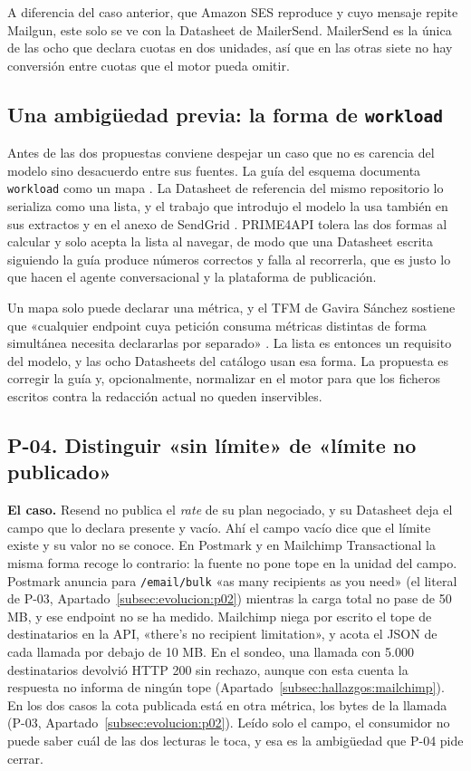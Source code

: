 A diferencia del caso anterior, que Amazon SES reproduce y cuyo mensaje repite Mailgun, este solo se ve con la Datasheet de MailerSend.
MailerSend es la única de las ocho que declara cuotas en dos unidades, así que en las otras siete no hay conversión entre cuotas que el motor pueda omitir.

\subsection{Una ambigüedad previa: la forma de \texttt{workload}}
\label{subsec:evolucion:dv01}

Antes de las dos propuestas conviene despejar un caso que no es carencia del
modelo sino desacuerdo entre sus fuentes. La guía del esquema documenta
\texttt{workload} como un mapa \citep{apisconsumptionmodel}. La Datasheet de
referencia del mismo repositorio lo serializa como una lista, y el trabajo que
introdujo el modelo la usa también en sus extractos y en el anexo de SendGrid
\citep{gavira2026tfm}. PRIME4API tolera las dos formas al calcular y solo acepta
la lista al navegar, de modo que una Datasheet escrita siguiendo la guía produce
números correctos y falla al recorrerla, que es justo lo que hacen el agente
conversacional y la plataforma de publicación.

Un mapa solo puede declarar una métrica, y el TFM de Gavira Sánchez sostiene que «cualquier endpoint cuya petición consuma métricas distintas de forma simultánea necesita declararlas por separado» \citep{gavira2026tfm}.
La lista es entonces un requisito del modelo, y las ocho Datasheets del catálogo usan esa forma.
La propuesta es corregir la guía y, opcionalmente, normalizar en el motor para que los ficheros escritos contra la redacción actual no queden inservibles.

\subsection{P-04. Distinguir «sin límite» de «límite no publicado»}
\label{subsec:evolucion:p04}

\textbf{El caso.} Resend no publica el \textit{rate} de su plan negociado, y su Datasheet deja el campo que lo declara presente y vacío.
Ahí el campo vacío dice que el límite existe y su valor no se conoce.
En Postmark y en Mailchimp Transactional la misma forma recoge lo contrario: la fuente no pone tope en la unidad del campo.
Postmark anuncia para \texttt{/email/bulk} «as many recipients as you need» (el literal de P-03, Apartado~\ref{subsec:evolucion:p02}) mientras la carga total no pase de 50 MB, y ese endpoint no se ha medido.
Mailchimp niega por escrito el tope de destinatarios en la API, «there's no recipient limitation», y acota el JSON de cada llamada por debajo de 10 MB.
En el sondeo, una llamada con 5.000 destinatarios devolvió HTTP 200 sin rechazo, aunque con esta cuenta la respuesta no informa de ningún tope (Apartado~\ref{subsec:hallazgos:mailchimp}).
En los dos casos la cota publicada está en otra métrica, los bytes de la llamada (P-03, Apartado~\ref{subsec:evolucion:p02}).
Leído solo el campo, el consumidor no puede saber cuál de las dos lecturas le toca, y esa es la ambigüedad que P-04 pide cerrar.

